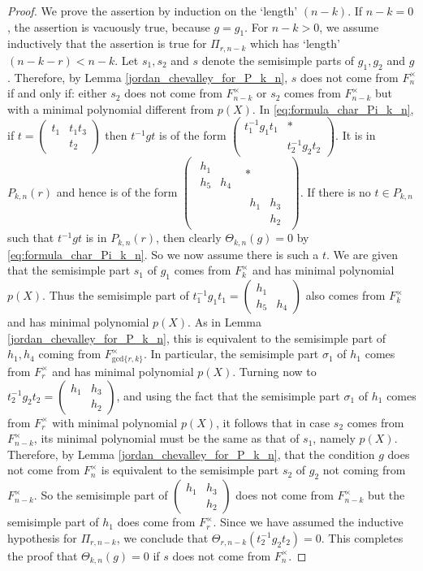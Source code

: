 \documentclass[reqno]{amsart}
\theoremstyle{definition}
\theoremstyle{remark}
\numberwithin{equation}{section}
\newcommand{\bbsm}{\left (\begin{smallmatrix}}      \newcommand{\besm}{\end{smallmatrix}\right )}
\begin{document}
\begin{proof}
 We prove the assertion  by induction on the `length' $(n-k)$. If $n-k=0$, the assertion is vacuously true, because $g=g_1$. For $n-k>0$, we assume inductively that the assertion is true for $\Pi_{r,n-k}$ which has `length' $(n-k-r) <n-k$.  Let $s_1, s_2$ and $s$ denote the semisimple parts of $g_1, g_2$ and $g$. Therefore, by Lemma \ref{jordan_chevalley_for_P_k_n},  $s$ does not come from $F_n^\times$ if and only if: either $s_2$ does not come from $F_{n-k}^\times$ or  $s_2$ comes  from $F_{n-k}^\times$ but with a minimal polynomial different from $p(X)$. In 
\eqref{eq:formula_char_Pi_k_n}, if $t=\bbsm t_1 & t_1t_3\\ & t_2 \besm$ then $t^{-1} g t$ is of the form $\bbsm t_1^{-1} g_1 t_1 & \ast \\ & t_2^{-1} g_2 t_2 \besm$. It is in $P_{k,n}(r)$ and hence is of the form $\bbsm \begin{smallmatrix}
h_1 &\\h_5 &h_4 \end{smallmatrix} & *\\ & \begin{smallmatrix}
h_1 &h_3\\ &h_2 \end{smallmatrix}\besm$.
If there is no $t \in P_{k,n}$ such that $t^{-1} g t$ is in $P_{k,n}(r)$, then clearly 
$\Theta_{k,n}(g)=0$ by \eqref{eq:formula_char_Pi_k_n}. So we now assume there is such a $t$. We are given that  the semisimple part $s_1$ of $g_1$ comes from $F_k^\times$ and has minimal polynomial $p(X)$. Thus the semisimple part of  $t_1^{-1} g_1 t_1 = \bbsm 
h_1 & \\ h_5 & h_4 \besm$
also comes from $F_k^\times$ and has minimal polynomial $p(X)$. 
As in Lemma \ref{jordan_chevalley_for_P_k_n},
this is equivalent to the semisimple part of $h_1, h_4$ coming from $F_{\text{gcd}\{r,k\}}^\times$. In particular, the semisimple part $\sigma_1$ of $h_1$ comes from $F_r^\times$ and has minimal polynomial $p(X)$. Turning now to 
$t_2^{-1} g_2 t_2= \bbsm h_1 & h_3\\ & h_2 \besm$, and using the fact that   the semisimple part $\sigma_1$ of $h_1$ comes from $F_r^\times$ with minimal polynomial $p(X)$, it follows that in case $s_2$ comes from $F_{n-k}^\times$, its minimal polynomial must be the same as that of $s_1$, namely $p(X)$. Therefore, by  Lemma \ref{jordan_chevalley_for_P_k_n}, that  the condition $g$ does not come from $F_n^\times$ is equivalent to the semisimple part $s_2$ of $g_2$ not coming from $F_{n-k}^\times$. So the semisimple part of $\bbsm h_1 & h_3\\ & h_2 \besm$ does not come from $F_{n-k}^\times$ but the semisimple part of $h_1$ does come from $F_r^\times$. Since we have assumed the inductive hypothesis for $\Pi_{r,n-k}$, we conclude that $\Theta_{r,n-k}(t_2^{-1} g_2 t_2)=0$. This completes the proof that $\Theta_{k,n}(g)=0$ if $s$ does not come from $F_n^\times$.
\end{proof}
\end{document}
